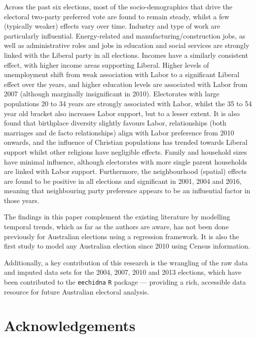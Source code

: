 \documentclass[times, doublespace]{anzsauth}
\begin{document}
Across the past six elections, most of the socio-demographics that drive the electoral two-party preferred vote are found to remain steady, whilst a few (typically weaker) effects vary over time. Industry and type of work are particularly influential. Energy-related and manufacturing/construction jobs, as well as administrative roles and jobs in education and social services are strongly linked with the Liberal party in all elections. Incomes have a similarly consistent effect, with higher income areas supporting Liberal. Higher levels of unemployment shift from weak association with Labor to a significant Liberal effect over the years, and higher education levels are associated with Labor from 2007 (although marginally insignificant in 2010). Electorates with large populations 20 to 34 years are strongly associated with Labor, whilst the 35 to 54 year old bracket also increases Labor support, but to a lesser extent. It is also found that birthplace diversity slightly favours Labor, relationships (both marriages and de facto relationships) align with Labor preference from 2010 onwards, and the influence of Christian populations has trended towards Liberal support whilst other religions have negligible effects. Family and household sizes have minimal influence, although electorates with more single parent households are linked with Labor support. Furthermore, the neighbourhood (spatial) effects are found to be positive in all elections and significant in 2001, 2004 and 2016, meaning that neighbouring party preference appears to be an influential factor in those years.

The findings in this paper complement the existing literature by modelling temporal trends, which as far as the authors are aware, has not been done previously for Australian elections using a regression framework. It is also the first study to model any Australian election since 2010 using Census information.

Additionally, a key contribution of this research is the wrangling of the raw data and imputed data sets for the 2004, 2007, 2010 and 2013 elections, which have been contributed to the \texttt{eechidna} \texttt{R} package --- providing a rich, accessible data resource for future Australian electoral analysis.

\hypertarget{acknowledgements}{%
\section{Acknowledgements}\label{acknowledgements}}
\end{document}
